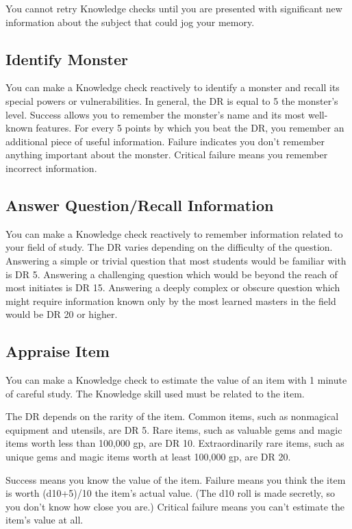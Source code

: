         You cannot retry Knowledge checks until you are presented with significant new information about the subject that could jog your memory.

    \subsection{Identify Monster}
        You can make a Knowledge check reactively to identify a monster and recall its special powers or vulnerabilities. In general, the DR is equal to 5 \add the monster's level. Success allows you to remember the monster's name and its most well-known features. For every 5 points by which you beat the DR, you remember an additional piece of useful information. Failure indicates you don't remember anything important about the monster. Critical failure means you remember incorrect information.

    \subsection{Answer Question/Recall Information}
        You can make a Knowledge check reactively to remember information related to your field of study. The DR varies depending on the difficulty of the question. Answering a simple or trivial question that most students would be familiar with is DR 5. Answering a challenging question which would be beyond the reach of most initiates is DR 15. Answering a deeply complex or obscure question which might require information known only by the most learned masters in the field would be DR 20 or higher.

    \subsection{Appraise Item}
        You can make a Knowledge check to estimate the value of an item with 1 minute of careful study. The Knowledge skill used must be related to the item.

        The DR depends on the rarity of the item. Common items, such as nonmagical equipment and utensils, are DR 5. Rare items, such as valuable gems and magic items worth less than 100,000 gp, are DR 10. Extraordinarily rare items, such as unique gems and magic items worth at least 100,000 gp, are DR 20.

        Success means you know the value of the item. Failure means you think the item is worth (d10+5)/10 \x the item's actual value. (The d10 roll is made secretly, so you don't know how close you are.) Critical failure means you can't estimate the item's value at all.

